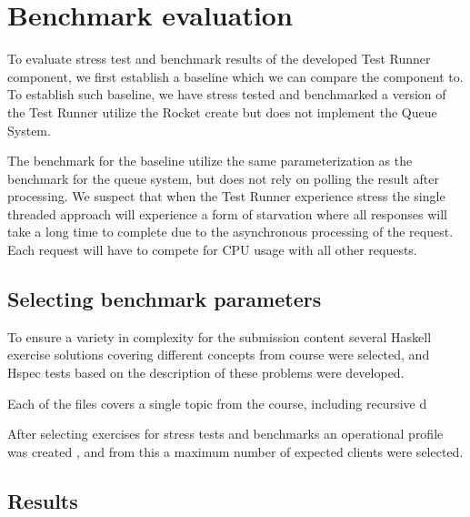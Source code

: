 \section{Benchmark evaluation}
To evaluate stress test and benchmark results of the developed Test Runner component, we first establish a baseline which we can compare the component to. 
To establish such baseline, we have stress tested and benchmarked a version of the Test Runner utilize the Rocket create but does not implement the Queue System. 


The benchmark for the baseline utilize the same parameterization as the benchmark for the queue system, but does not rely on polling the result after processing. 
We suspect that when the Test Runner experience stress the single threaded approach will experience a form of starvation where all responses will take a long time to complete due to the asynchronous processing of the request. Each request will have to compete for CPU usage with all other requests. 

\subsection{Selecting benchmark parameters}
To ensure a variety in complexity for the submission content several Haskell exercise solutions covering different concepts from course were selected, and Hspec tests based on the description of these problems were developed.  

Each of the files covers a single topic from the course, including recursive d

After selecting exercises for stress tests and benchmarks an operational profile was created , and from this a maximum number of expected clients were selected. 








\subsection{Results}


